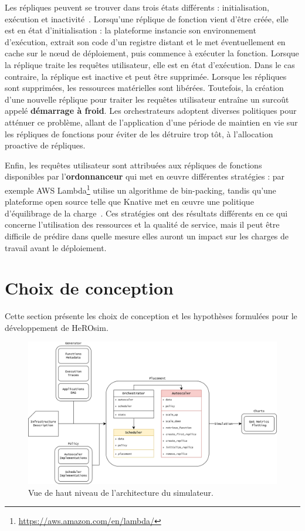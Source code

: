 Les répliques peuvent se trouver dans trois états différents : initialisation, exécution et inactivité~\cite{SchleierSmith2021WhatSC}. Lorsqu'une réplique de fonction vient d'être créée, elle est en état d'initialisation : la plateforme instancie son environnement d'exécution, extrait son code d'un registre distant et le met éventuellement en cache sur le nœud de déploiement, puis commence à exécuter la fonction. Lorsque la réplique traite les requêtes utilisateur, elle est en état d'exécution. Dans le cas contraire, la réplique est inactive et peut être supprimée. Lorsque les répliques sont supprimées, les ressources matérielles sont libérées. Toutefois, la création d'une nouvelle réplique pour traiter les requêtes utilisateur entraîne un surcoût appelé \textbf{démarrage à froid}. Les orchestrateurs adoptent diverses politiques pour atténuer ce problème, allant de l'application d'une période de maintien en vie sur les répliques de fonctions pour éviter de les détruire trop tôt, à l'allocation proactive de répliques.

Enfin, les requêtes utilisateur sont attribuées aux répliques de fonctions disponibles par l'\textbf{ordonnanceur} qui met en œuvre différentes stratégies : par exemple AWS Lambda\footnote{\href{https://aws.amazon.com/en/lambda/}{https://aws.amazon.com/en/lambda/}} utilise un algorithme de bin-packing, tandis qu'une plateforme open source telle que Knative met en œuvre une politique d'équilibrage de la charge~\cite{Lannurien2023}. Ces stratégies ont des résultats différents en ce qui concerne l'utilisation des ressources et la qualité de service, mais il peut être difficile de prédire dans quelle mesure elles auront un impact sur les charges de travail avant le déploiement.

\section{Choix de conception}
\label{section:herosim-herosim}

Cette section présente les choix de conception et les hypothèses formulées pour le développement de HeROsim.

\begin{figure}[t]
    \centering
    \includegraphics[width=\columnwidth]{6_Chapitre6/figures/software-architecture.png}
    \caption{Vue de haut niveau de l'architecture du simulateur.}
\label{figure:herosim-software-architecture}
\end{figure}

